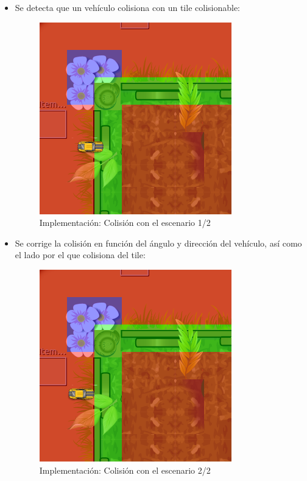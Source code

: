 \begin{itemize}
    \item Se detecta que un vehículo colisiona con un tile colisionable:
    \begin{figure}[H]
      \label{colision1}
      \begin{center}
        \includegraphics[scale=0.7]{imagenes/colision1.png}
      \end{center}
      \caption{Implementación: Colisión con el escenario 1/2}
    \end{figure}
    
    \item Se corrige la colisión en función del ángulo y dirección del
    vehículo, así como el lado por el que colisiona del tile:
    \begin{figure}[H]
      \label{colision2}
      \begin{center}
        \includegraphics[scale=0.7]{imagenes/colision2.png}
      \end{center}
      \caption{Implementación: Colisión con el escenario 2/2}
    \end{figure}
    
\end{itemize}

